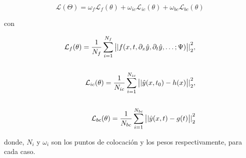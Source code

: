 \begin{equation}
	\mathcal{L}(\Theta) = \omega_f\mathcal{L}_f(\theta) + \omega_{ic}\mathcal{L}_{ic}(\theta) + \omega_{bc}\mathcal{L}_{bc}(\theta)
\end{equation}

con 

\begin{eqnarray}
	\mathcal{L}_f(\theta) = \frac{1}{N_f}\sum\limits_{i = 1}^{N_f} \big{||} f(x,t, \partial_x\hat{y},\partial_t\hat{y}, \dots; \Psi)\big{||}_2^2, \\ \nonumber \\
	\mathcal{L}_{ic}(\theta) = \frac{1}{N_{ic}}\sum\limits_{i = 1}^{N_{ic}} \big{||} \hat{y}(x,t_0) - h(x) \big{||}_2^2, \\ \nonumber \\
	\mathcal{L}_{bc}(\theta) = \frac{1}{N_{bc}}\sum\limits_{i = 1}^{N_{bc}} \big{||} \hat{y}(x,t) - g(t) \big{||}_2^2
\end{eqnarray}

donde, $N_i$ y $\omega_i$ son los puntos de colocación y los pesos respectivamente, para cada caso.

